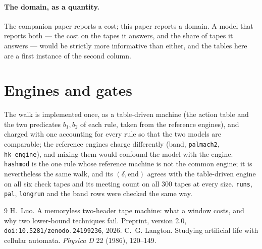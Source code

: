 \documentclass[11pt]{article}
\theoremstyle{remark}
\begin{document}
\paragraph{The domain, as a quantity.} The companion paper reports a cost; this paper reports a domain. A
model that reports both --- the cost on the tapes it answers, and the share of tapes it answers --- would be
strictly more informative than either, and the tables here are a first instance of the second column.

\appendix
\section{Engines and gates}

The walk is implemented once, as a table-driven machine (the action table and the two predicates
$b_1,b_2$ of each rule, taken from the reference engines), and charged with one accounting for every rule so
that the two models are comparable; the reference engines charge differently (band, \texttt{palmach2},
\texttt{hk\_engine}), and mixing them would confound the model with the engine. \texttt{hashmod} is the one rule
whose reference machine is not the common engine; it is nevertheless the same walk, and its $(\delta,\text
{end})$ agrees with the table-driven engine on all six check tapes and its meeting count on all $300$ tapes
at every size. \texttt{runs}, \texttt{pal}, \texttt{longrun} and the band rows were checked the same way.

\begin{thebibliography}{9}
 H.~Luo. A memoryless two-header tape machine: what a window costs, and why
two lower-bound techniques fail. Preprint, version 2.0, \texttt{doi:10.5281/zenodo.24199236}, 2026.
 C.~G. Langton. Studying artificial life with cellular automata.
\emph{Physica D} 22 (1986), 120--149.
\end{thebibliography}
\end{document}
